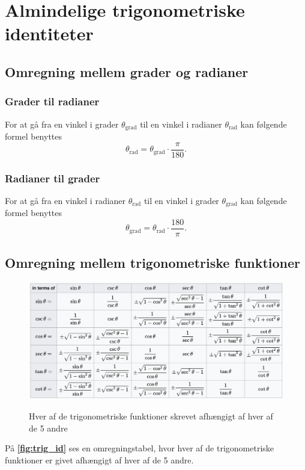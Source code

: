 \section{Almindelige trigonometriske identiteter}

\subsection{Omregning mellem grader og radianer}

\subsubsection{Grader til radianer}
For at gå fra en vinkel i grader $\theta_{\text{grad}}$ til en vinkel i radianer $\theta_{\text{rad}}$ kan følgende formel benyttes
\[ 
\theta_{\text{rad}} = \theta_{\text{grad}} \cdot \frac{\pi}{180}
.\]

\subsubsection{Radianer til grader}
For at gå fra en vinkel i radianer $\theta_{\text{rad}}$ til en vinkel i grader $\theta_{\text{grad}}$ kan følgende formel benyttes
\[ 
\theta_{\text{grad}} = \theta_{\text{rad}} \cdot \frac{180}{\pi}
.\]


\subsection{Omregning mellem trigonometriske funktioner}
\begin{figure} [ht]
  \centering
  \caption{Hver af de trigonometriske funktioner skrevet afhængigt af hver af de 5 andre}
  \includegraphics[width=0.8\linewidth]{../figures/trig_id.png}
  \label{fig:trig_id}
\end{figure}

På \textbf{\autoref{fig:trig_id}} ses en omregningstabel, hvor hver af de trigonometriske funktioner er givet afhængigt af hver af de 5 andre.

